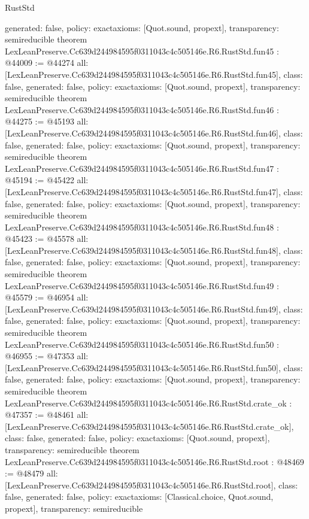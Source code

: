 \begin{lexlean}{RustStd}
\begin{coremodule}
{  generated: false,
  policy: exact{axioms: [Quot.sound, propext]},
  transparency: semireducible
}
theorem LexLeanPreserve.Cc639d244984595f0311043c4c505146e.R6.RustStd.fun45 : @44009 := @44274 {
  all: [LexLeanPreserve.Cc639d244984595f0311043c4c505146e.R6.RustStd.fun45],
  class: false,
  generated: false,
  policy: exact{axioms: [Quot.sound, propext]},
  transparency: semireducible
}
theorem LexLeanPreserve.Cc639d244984595f0311043c4c505146e.R6.RustStd.fun46 : @44275 := @45193 {
  all: [LexLeanPreserve.Cc639d244984595f0311043c4c505146e.R6.RustStd.fun46],
  class: false,
  generated: false,
  policy: exact{axioms: [Quot.sound, propext]},
  transparency: semireducible
}
theorem LexLeanPreserve.Cc639d244984595f0311043c4c505146e.R6.RustStd.fun47 : @45194 := @45422 {
  all: [LexLeanPreserve.Cc639d244984595f0311043c4c505146e.R6.RustStd.fun47],
  class: false,
  generated: false,
  policy: exact{axioms: [Quot.sound, propext]},
  transparency: semireducible
}
theorem LexLeanPreserve.Cc639d244984595f0311043c4c505146e.R6.RustStd.fun48 : @45423 := @45578 {
  all: [LexLeanPreserve.Cc639d244984595f0311043c4c505146e.R6.RustStd.fun48],
  class: false,
  generated: false,
  policy: exact{axioms: [Quot.sound, propext]},
  transparency: semireducible
}
theorem LexLeanPreserve.Cc639d244984595f0311043c4c505146e.R6.RustStd.fun49 : @45579 := @46954 {
  all: [LexLeanPreserve.Cc639d244984595f0311043c4c505146e.R6.RustStd.fun49],
  class: false,
  generated: false,
  policy: exact{axioms: [Quot.sound, propext]},
  transparency: semireducible
}
theorem LexLeanPreserve.Cc639d244984595f0311043c4c505146e.R6.RustStd.fun50 : @46955 := @47353 {
  all: [LexLeanPreserve.Cc639d244984595f0311043c4c505146e.R6.RustStd.fun50],
  class: false,
  generated: false,
  policy: exact{axioms: [Quot.sound, propext]},
  transparency: semireducible
}
theorem LexLeanPreserve.Cc639d244984595f0311043c4c505146e.R6.RustStd.crate_ok : @47357 := @48461 {
  all: [LexLeanPreserve.Cc639d244984595f0311043c4c505146e.R6.RustStd.crate_ok],
  class: false,
  generated: false,
  policy: exact{axioms: [Quot.sound, propext]},
  transparency: semireducible
}
theorem LexLeanPreserve.Cc639d244984595f0311043c4c505146e.R6.RustStd.root : @48469 := @48479 {
  all: [LexLeanPreserve.Cc639d244984595f0311043c4c505146e.R6.RustStd.root],
  class: false,
  generated: false,
  policy: exact{axioms: [Classical.choice, Quot.sound, propext]},
  transparency: semireducible
}


\end{coremodule}
\end{lexlean}
